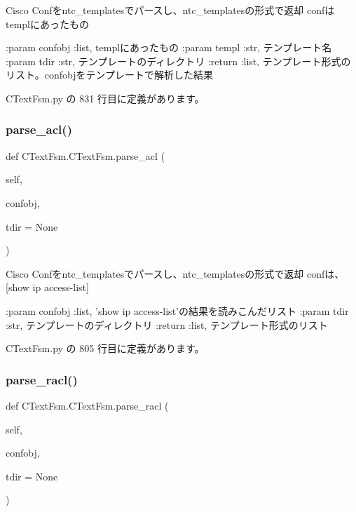 \begin{DoxyVerb}Cisco Confをntc_templatesでパースし、ntc_templatesの形式で返却
confはtemplにあったもの

:param  confobj :list, templにあったもの
:param  templ   :str, テンプレート名
:param  tdir    :str, テンプレートのディレクトリ
:return :list, テンプレート形式のリスト。confobjをテンプレートで解析した結果
\end{DoxyVerb}
 

 C\+Text\+Fsm.\+py の 831 行目に定義があります。

\mbox{\label{classCTextFsm_1_1CTextFsm_aadf519d7468e4b3d2237e3b189d3514c}} 
\subsubsection{\texorpdfstring{parse\_acl()}{parse\_acl()}}
{\footnotesize\ttfamily def C\+Text\+Fsm.\+C\+Text\+Fsm.\+parse\+\_\+acl (\begin{DoxyParamCaption}\item[{}]{self,  }\item[{}]{confobj,  }\item[{}]{tdir = {\ttfamily None} }\end{DoxyParamCaption})}

\begin{DoxyVerb}Cisco Confをntc_templatesでパースし、ntc_templatesの形式で返却
confは、[show ip access-list]

:param confobj :list, 'show ip access-list'の結果を読みこんだリスト
:param tdir    :str, テンプレートのディレクトリ
:return :list, テンプレート形式のリスト
\end{DoxyVerb}
 

 C\+Text\+Fsm.\+py の 805 行目に定義があります。

\mbox{\label{classCTextFsm_1_1CTextFsm_af4bf12c19b9be216a0a2c8c9ae8f0459}} 
\subsubsection{\texorpdfstring{parse\_racl()}{parse\_racl()}}
{\footnotesize\ttfamily def C\+Text\+Fsm.\+C\+Text\+Fsm.\+parse\+\_\+racl (\begin{DoxyParamCaption}\item[{}]{self,  }\item[{}]{confobj,  }\item[{}]{tdir = {\ttfamily None} }\end{DoxyParamCaption})}

